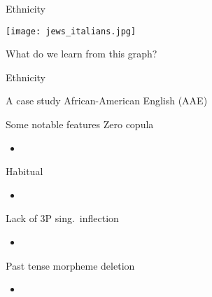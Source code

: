 \documentclass{beamer}
\newcommand{\subonefive}{Ethnicity}
\begin{document}
      \begin{frame}{\subonefive}
        \begin{center}
          \texttt{[image: jews\_italians.jpg]}
        \end{center}
        \begin{block}{What do we learn from this graph?}
        \end{block}
      \end{frame}

      \begin{frame}{\subonefive}
        \begin{block}{A case study}
          African-American English (AAE)
        \end{block}
        \begin{block}{Some notable features}
          Zero copula
          \begin{itemize}
            \item {}
          \end{itemize}
          Habitual 
          \begin{itemize}
            \item {}
          \end{itemize}
          Lack of 3P sing.~inflection \parencite{rickford_addressee-_1994}
          \begin{itemize}
            \item {}
          \end{itemize}
          Past tense morpheme deletion \parencite{finegan_african_2004}
          \begin{itemize}
            \item {}
          \end{itemize}
        \end{block}
      \end{frame}
\end{document}
